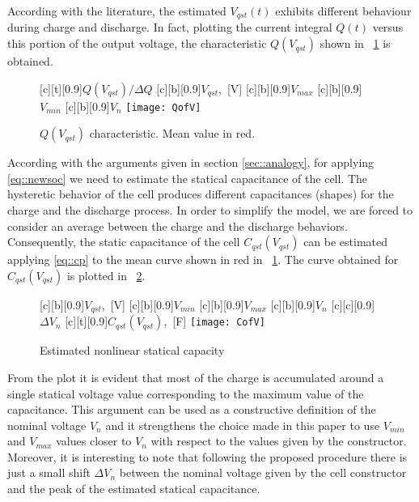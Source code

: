 \documentclass[journal]{IEEEtran}
\begin{document}
According with the literature, the estimated $V_{qst}(t)$ exhibits different behaviour during charge and discharge. In fact, plotting the current integral $Q(t)$ versus this portion of the output voltage, the characteristic $Q(V_{qst})$ shown in \figurename~\ref{fig::OCVSOC} is obtained. 
\begin{figure}[!htbp]
    [c][t][0.9]{\scriptsize{$Q(V_{qst}) / \Delta Q$}}
    [c][b][0.9]{\scriptsize{$V_{qst}$,~[V]}}
    [c][b][0.9]{\scriptsize{$V_{max}$}}
    [c][b][0.9]{\scriptsize{$V_{min}$}}
    [c][b][0.9]{\scriptsize{$V_{n}$}}
	\centering
		\texttt{[image: QofV]}
	\caption{$Q(V_{qst})$ characteristic. Mean value in red.}
	\label{fig::OCVSOC}
\end{figure}
According with the arguments given in section \ref{sec::analogy}, for applying \eqref{eq::newsoc} we need to estimate the statical capacitance of the cell. The hysteretic behavior of the cell produces different capacitances (shapes) for the charge and the discharge process. In order to simplify the model, we are forced to consider an average between the charge and the discharge behaviors. Consequently, the static capacitance of the cell $C_{qst}(V_{qst})$ can be estimated applying \eqref{eq::cp} to the mean curve shown in red in \figurename~\ref{fig::OCVSOC}. The curve obtained for  $C_{qst}(V_{qst})$ is plotted in \figurename~\ref{fig::capqst}.
\begin{figure}[!htbp]
    [c][b][0.9]{\scriptsize{$V_{qst}$,~[V]}}
    [c][b][0.9]{\scriptsize{$V_{min}$}}
    [c][b][0.9]{\scriptsize{$V_{max}$}}
    [c][b][0.9]{\scriptsize{$V_{n}$}}
    [c][c][0.9]{\scriptsize{$\Delta V_{n}$}}
    [c][t][0.9]{\scriptsize{$C_{qst}(V_{qst})$,~[F]}}
	\centering
		\texttt{[image: CofV]}
	\caption{Estimated nonlinear statical capacity}
	\label{fig::capqst}
\end{figure}
From the plot it is evident that most of the charge is accumulated around a single statical voltage value corresponding to the maximum value of the capacitance. This argument can be used as a constructive definition of the nominal voltage $V_n$ and it strengthens the choice made in this paper to use $V_{min}$ and $V_{max}$ values closer to $V_{n}$ with respect to the values given by the constructor. Moreover, it is interesting to note that following the proposed procedure there is just a small shift $\Delta V_{n}$ between the nominal voltage given by the cell constructor and the peak of the estimated statical capacitance. 
\end{document}
